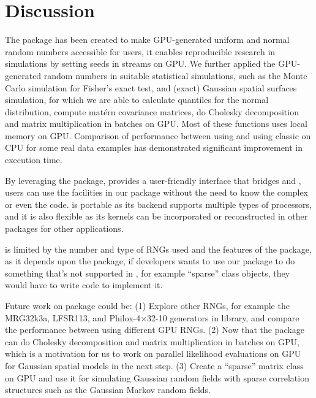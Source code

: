 \documentclass[article,nojss]{jss}\usepackage[]{graphicx}\usepackage[]{color}
\begin{document}
\section{Discussion}
The package  has been created to make GPU-generated uniform and normal random numbers accessible for  users, it enables reproducible research in simulations by setting seeds in streams on GPU. We further applied the GPU-generated random numbers in suitable statistical simulations, such as the Monte Carlo simulation for Fisher’s exact test, and (exact) Gaussian spatial surfaces simulation, for which we are able to calculate quantiles for the normal distribution, compute mat\'ern covariance matrices, do Cholesky decomposition and matrix multiplication in batches on GPU. Most of these functions uses local memory on GPU. Comparison of performance between using  and using classic  on CPU for some real data examples has demonstrated significant improvement in execution time. 

By leveraging the  package,  provides a user-friendly interface that bridges  and , users can use the facilities in our package without the need to know the complex  or even the  code.   is portable as its backend  supports multiple types of processors, and it is also flexible as its kernels can be incorporated or reconstructed in other  packages for other applications. 


 is limited by the number and type of  RNGs used and the features of the  package, as it depends upon the  package, if developers wants to use our package to do something that's not supported in , for example ``sparse'' class objects, they would have to write  code to implement it.

Future work on  package could be: (1) Explore other RNGs, for example the MRG32k3a, LFSR113, and Philox-4×32-10 generators in  library, and compare the  performance between using different GPU RNGs. (2) Now that the package can do Cholesky decomposition and matrix multiplication in batches on GPU, which is a motivation for us to work on parallel likelihood evaluations on GPU for Gaussian spatial models in the next step. (3) Create a ``sparse'' matrix class on GPU and use it for simulating Gaussian random fields with sparse correlation structures such as the Gaussian Markov random fields.
\end{document}

